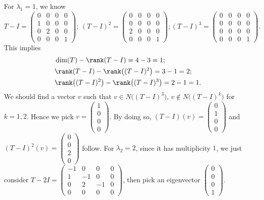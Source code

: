 \begin{Exercise}
\begin{enumerate}[(a)]
\begin{solution}
For $\lambda_1 = 1$, we know
$$
T-I = \begin{pmatrix}
0 & 0 & 0 & 0 \\
1 & 0 & 0 & 0 \\
0 & 2 & 0 & 0 \\
0 & 0 & 0 & 1
\end{pmatrix};\
(T-I)^2 = \begin{pmatrix}
0 & 0 & 0 & 0 \\
0 & 0 & 0 & 0 \\
2 & 0 & 0 & 0 \\
0 & 0 & 0 & 1
\end{pmatrix}; 
(T-I)^3 = \begin{pmatrix}
0 & 0 & 0 & 0 \\
0 & 0 & 0 & 0 \\
0 & 0 & 0 & 0 \\
0 & 0 & 0 & 1
\end{pmatrix}.
$$
This implies
\begin{align*}
&\dim(T)-\rank(T-I) = 4-3 = 1; \\
&\rank(T-I) - \rank\big((T-I)^2\big) = 3 - 1 = 2; \\
&\rank\big((T-I)^2\big) - \rank\big((T-I)^3\big) = 2-1 = 1.
\end{align*}
We should find a vector $v$ such that $v\in N\big((T-I)^3\big)$, $v\notin N\big((T-I)^k\big)$ for $k=1,2$. Hence we pick $v = \begin{pmatrix}
1 \\
0 \\
0 \\
0
\end{pmatrix}$. By doing so, $(T-I)(v) = \begin{pmatrix}
0 \\
1 \\
0 \\
0
\end{pmatrix}$ and $(T-I)^2(v) = \begin{pmatrix}
0 \\
0 \\
2 \\
0
\end{pmatrix}$ follow.
For $\lambda_2 = 2$, since it has multiplicity $1$, we just consider $T-2I = \begin{pmatrix}
-1 & 0 & 0 & 0 \\
1 & -1 & 0 & 0 \\
0 & 2 & -1 & 0 \\
0 & 0 & 0 & 0
\end{pmatrix}$, then pick an eigenvector $\begin{pmatrix}
0 \\
0 \\
0 \\
1
\end{pmatrix}$.


\end{solution}
\end{enumerate}
\end{Exercise}
